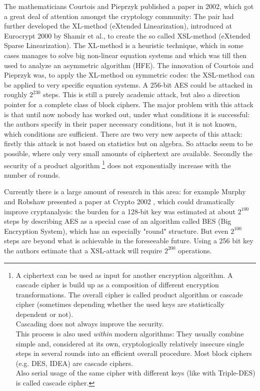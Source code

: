 The mathematicians Courtois and Pieprzyk \cite{cm:Courtois2002} published a paper
in 2002, which got a great deal of attention amongst the cryptology community: The
pair had further developed the XL-method (eXtended Linearization), introduced at
Eurocrypt 2000 by Shamir et al., to create the so called XSL-method (eXtended
Sparse Linearization). The XL-method is a heuristic technique, which in some
cases manages to solve big non-linear equation systems and which was till then
used to analyze an asymmetric algorithm (HFE).  The innovation of Courtois and
Pieprzyk was, to apply the XL-method on symmetric codes: the XSL-method can be
applied to very specific equation systems. A 256-bit AES could be attacked in
roughly $2^{230}$ steps. This is still a purely academic attack, but also a
direction pointer for a complete class of block ciphers. The major problem with
this attack is that until now nobody has worked out, under what conditions it is
successful: the authors specify in their paper necessary conditions, but it is
not known, which conditions are sufficient.  There are two very new aspects of
this attack: firstly this attack is not based on statistics but on algebra. So
attacks seem to be possible, where only very small amounts of ciphertext are
available. Secondly the security of a product algorithm%
%
%
\footnote{%
A ciphertext can be used as input for another encryption algorithm. 
A cascade cipher%
%
%
is build up as a composition of different encryption transformations.
The overall cipher is called product algorithm or cascade cipher
(sometimes depending whether the used keys are statistically dependent or not).\\
Cascading does not always improve the security.\\
This process is also used {\em within} modern algorithms:
They usually combine simple and, considered at its own, cryptologically
relatively insecure single steps in several rounds into an efficient 
overall procedure.  Most block ciphers (e.g. DES, IDEA) are cascade ciphers.\\
Also serial usage of the same cipher with different keys (like with Triple-DES)
is called cascade cipher. 
}
does not exponentially increase with the number of rounds.

Currently there is a large amount of research in this area: for example Murphy and Robshaw presented a paper at Crypto 2002 \cite{cm:Robshaw2002a}, which could dramatically improve cryptanalysis: the burden for a 128-bit key was estimated at about $2^{100}$ steps by describing AES as a special case of an algorithm called BES (Big Encryption System), which has an especially "round" structure. But even $2^{100}$ steps are beyond what is achievable in the foreseeable future. Using a 256 bit key the authors estimate that a XSL-attack will require $2^{200}$ operations.

